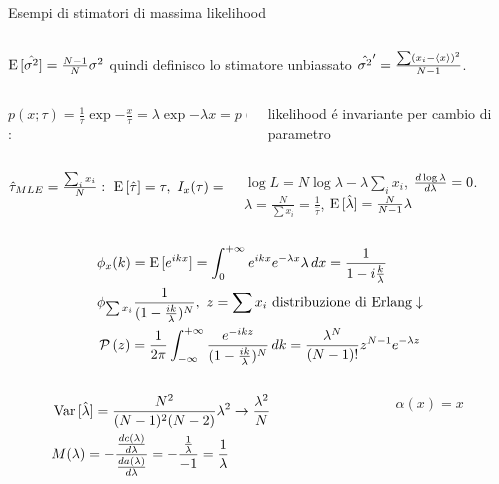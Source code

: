 \documentclass[asd-beamer.tex]{subfiles}%
\begin{document}
\begin{frame}{Esempi di stimatori di massima likelihood}
\begin{columns}[T]
\end{columns}
$\operatorname{E}{[\hat{\sigma^2}]}=\frac{N-1}{N}\sigma^2$ quindi definisco lo stimatore unbiassato $\hat{\sigma^2}'=\frac{\sum(x_i-\langle x \rangle)^2}{N-1}$.
\begin{columns}[T]
\begin{column}{0.6\textwidth}
 $p(x;\tau)=\frac{1}{\tau}\exp{-\frac{x}{\tau}}=\lambda\exp{-\lambda x}=p(x;\lambda)$:
\end{column}
\begin{column}{0.4\textwidth}
likelihood \'e invariante per cambio di parametro
\end{column}
\end{columns}
\begin{columns}[b]
\begin{column}{0.4\textwidth}
$\hat{\tau}_{MLE}=\frac{\sum_ix_i}{N}:\ \E{[\hat{\tau}]}=\tau,\ I_x(\tau)=\frac{1}{\var{\hat{\tau}}},\ \var{\hat{\tau}}=\frac{\tau^2}{N}$
\end{column}
\begin{column}{0.6\textwidth}
$\log{L}=N\log{\lambda}-\lambda\sum_ix_i$, $\frac{d \log{\lambda}}{d \lambda}=0$. $\hat{\lambda}=\frac{N}{\sum x_i}=\frac{1}{\hat{\tau}}$, $\operatorname{E}{[\hat{\lambda}]}=\frac{N}{N-1}\lambda$
\end{column}
\end{columns}
\begin{align*}
&\phi_x(k)=\E{[\exp{ikx}]}=\intzi\exp{ikx}\exp{-\lambda x}\lambda\,dx=\frac{1}{1-i\frac{k}{\lambda}}\\
&\phi_{\sum x_i}\frac{1}{(1-\frac{ik}{\lambda})^N},\ z=\sum x_i\ \text{distribuzione di Erlang}\downarrow\\
&\prob{(z)}=\frac{1}{2\pi}\intsinf{}\frac{\exp{-ikz}}{(1-\frac{ik}{\lambda})^N}\,dk=\frac{\lambda^N}{(N-1)!}z^{N-1}\exp{-\lambda z}
\end{align*}
\begin{columns}[T]
\begin{column}{0.65\textwidth}
\begin{align*}
&\operatorname{Var}{[\hat{\lambda}]}=\frac{N^2}{(N-1)^2(N-2)}\lambda^2\to\frac{\lambda^2}{N}\\
&M(\lambda)=-\frac{\frac{d c(\lambda)}{d \lambda}}{\frac{d a(\lambda)}{d \lambda}}=-\frac{\frac{1}{\lambda}}{-1}=\frac{1}{\lambda}
\end{align*}
\end{column}
\begin{column}{0.35\textwidth}
\begin{align*}
&\alpha(x)=x\\

\end{align*}
\end{column}
\end{columns}
\end{frame}
\end{document}
